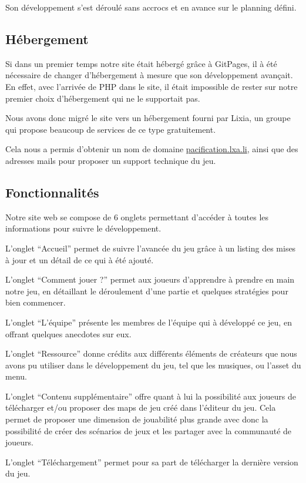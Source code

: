 \documentclass[12pt]{report}
\begin{document}
Son développement s’est déroulé sans accrocs et en avance sur le planning
défini.

\subsection{Hébergement}

Si dans un premier temps notre site était hébergé grâce à GitPages, il à été
nécessaire de changer d’hébergement à mesure que son développement avançait. En
effet, avec l’arrivée de PHP dans le site, il était impossible de rester sur
notre premier choix d'hébergement qui ne le supportait pas.

Nous avons donc migré le site vers un hébergement fourni par Lixia, un groupe
qui propose beaucoup de services de ce type gratuitement.

Cela nous a permis d’obtenir un nom de domaine \url{pacification.lxa.li}, ainsi
que des adresses mails pour proposer un support technique du jeu. 

\subsection{Fonctionnalités}

Notre site web se compose de 6 onglets permettant d'accéder à toutes les
informations pour suivre le développement.

L’onglet “Accueil” permet de suivre l’avancée du jeu grâce à un listing des
mises à jour et un détail de ce qui à été ajouté.

L’onglet “Comment jouer ?” permet aux joueurs d’apprendre à prendre en main
notre jeu, en détaillant le déroulement d’une partie et quelques stratégies pour
bien commencer.

L’onglet “L’équipe” présente les membres de l’équipe qui à développé ce jeu, en
offrant quelques anecdotes sur eux.

L’onglet “Ressource” donne crédits aux différents éléments de créateurs que nous
avons pu utiliser dans le développement du jeu, tel que les musiques, ou l’asset
du menu.

L’onglet “Contenu supplémentaire” offre quant à lui la possibilité aux joueurs
de télécharger et/ou proposer des maps de jeu créé dans l’éditeur du jeu. Cela
permet de proposer une dimension de jouabilité plus grande avec donc la
possibilité de créer des scénarios de jeux et les partager avec la communauté de
joueurs.

L’onglet “Téléchargement” permet pour sa part de télécharger la dernière version
du jeu.
\end{document}

